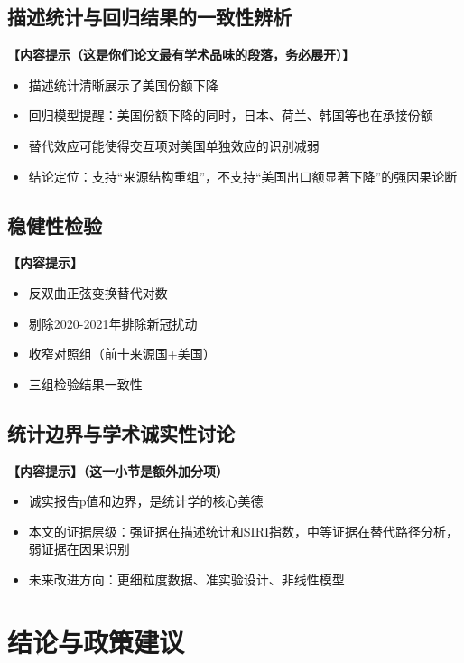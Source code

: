 \documentclass[UTF8,a4paper,12pt]{ctexart}
\begin{document}
\subsection{描述统计与回归结果的一致性辨析}
\noindent\textbf{【内容提示（这是你们论文最有学术品味的段落，务必展开）】}
\begin{itemize}[nosep]
    \item 描述统计清晰展示了美国份额下降
    \item 回归模型提醒：美国份额下降的同时，日本、荷兰、韩国等也在承接份额
    \item 替代效应可能使得交互项对美国单独效应的识别减弱
    \item 结论定位：支持“来源结构重组”，不支持“美国出口额显著下降”的强因果论断
\end{itemize}

\subsection{稳健性检验}
\noindent\textbf{【内容提示】}
\begin{itemize}[nosep]
    \item 反双曲正弦变换替代对数
    \item 剔除2020-2021年排除新冠扰动
    \item 收窄对照组（前十来源国+美国）
    \item 三组检验结果一致性
\end{itemize}

\subsection{统计边界与学术诚实性讨论}
\noindent\textbf{【内容提示】（这一小节是额外加分项）}
\begin{itemize}[nosep]
    \item 诚实报告p值和边界，是统计学的核心美德
    \item 本文的证据层级：强证据在描述统计和SIRI指数，中等证据在替代路径分析，弱证据在因果识别
    \item 未来改进方向：更细粒度数据、准实验设计、非线性模型
\end{itemize}

\section{结论与政策建议}
\end{document}
